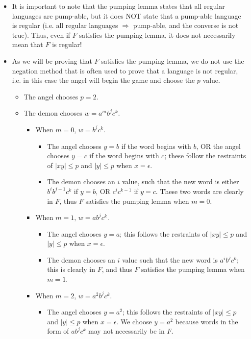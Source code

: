 \documentclass{article}
\begin{document}
\begin{itemize}
    \item It is important to note that the pumping lemma states that all regular languages are pump-able, but it does NOT state that a pump-able language is regular (i.e. all regular languages \(\Longrightarrow\) pump-able, and the converse is not true). Thus, even if \(F\) satisfies the pumping lemma, it does not necessarily mean that \(F\) is regular!
    \item As we will be proving that \(F\) satisfies the pumping lemma, we do not use the negation method that is often used to prove that a language is not regular, i.e. in this case the angel will begin the game and choose the \(p\) value.
    \begin{itemize}
        \item The angel chooses \(p=2\).
        \item The demon chooses \(w = a^m b^j c^k\).
        \begin{itemize}
            \item When \(m=0\), \(w=b^j c^k\).
            \begin{itemize}
                \item The angel chooses \(y=b\) if the word begins with \(b\), OR the angel chooses \(y=c\) if the word begins with \(c\); these follow the restraints of \(|xy|\leq p\) and \(|y| \leq p\) when \(x=\epsilon\).
                \item The demon chooses an \(i\) value, such that the new word is either \(b^i b^{j-1} c^k\) if \(y=b\), OR \(c^i c^{k-1}\) if \(y=c\). These two words are clearly in \(F\), thus \(F\) satisfies the pumping lemma when \(m=0\).
            \end{itemize}
            \item When \(m=1\), \(w=a b^j c^k\).
            \begin{itemize}
                \item The angel chooses \(y=a\); this follows the restraints of \(|xy|\leq p\) and \(|y| \leq p\) when \(x=\epsilon\).
                \item The demon chooses an \(i\) value such that the new word is \(a^i b^j c^k\); this is clearly in \(F\), and thus \(F\) satisfies the pumping lemma when \(m=1\).
            \end{itemize}
            \item When \(m=2\), \(w=a^2 b^j c^k\).
            \begin{itemize}
                \item The angel chooses \(y=a^2\); this follows the restraints of \(|xy|\leq p\) and \(|y| \leq p\) when \(x=\epsilon\). We choose \(y=a^2\) because words in the form of \(a b^j c^k\) may not necessarily be in \(F\).

\end{itemize}
\end{itemize}
\end{itemize}
\end{itemize}
\end{document}
